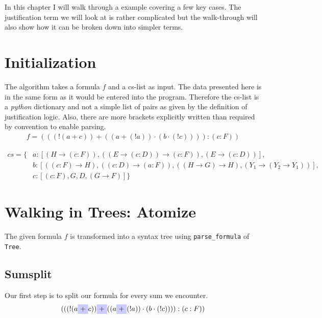 In this chapter I will walk through a example covering a few key cases. The justification term we will look at is rather complicated but the walk-through will also show how it can be broken down into simpler terms.

\section{Initialization}
The algorithm takes a formula $f$ and a cs-list as input. The data presented here is in the same form as it would be entered into the program. Therefore the cs-list is a \emph{python} dictionary and not a simple list of pairs as given by the definition of justification logic. Also, there are more brackets explicitly written than required by convention to enable parsing.
\begin{align}\label{eq:f}
f = (((!(a+c))+((a+(!a))\cdot (b\cdot (!c)))):(c:F))
\end{align}

\begin{equation}\label{cs}
\begin{split}
	cs = \{& a: [(H \rightarrow (c:F)), ((E \rightarrow (c:D)) \rightarrow (c:F)), (E \rightarrow (c:D))],\\
	& b: [((c:F) \rightarrow H), ((c:D) \rightarrow (a:F)), ((H \rightarrow G) \rightarrow H), (Y_1 \rightarrow (Y_2 \rightarrow Y_1))],\\
	& c: [(c:F), G, D, (G \rightarrow F)]\}
\end{split}
\end{equation}

\section{Walking in Trees: Atomize}

The given formula $f$ is transformed into a syntax tree using \texttt{parse\_formula} of \texttt{Tree}. 

\subsection{Sumsplit}
Our first step is to split our formula for every sum we encounter.
\begin{equation*}
	(((!(a
    \tikz[baseline]{\node[fill=blue!20,anchor=base] (t1){$+$};} c))
    \tikz[baseline]{\node[fill=blue!20,anchor=base] (t2){$+$};} ((a
    \tikz[baseline]{\node[fill=blue!20,anchor=base] (t3){$+$};} (!a))\cdot (b\cdot (!c)))):(c:F))
\end{equation*}

